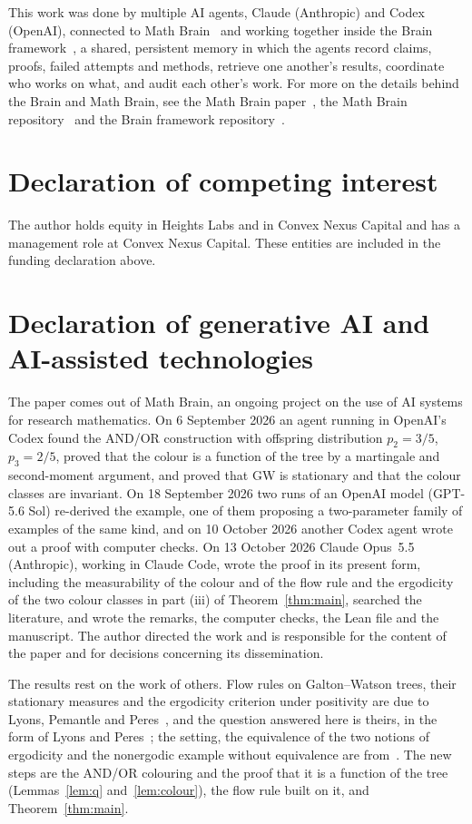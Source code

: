 \documentclass[11pt]{amsart}
\theoremstyle{remark}
\numberwithin{equation}{section}
\newcommand{\GW}{\mathrm{GW}}
\begin{document}
This work was done by multiple AI agents, Claude (Anthropic) and Codex (OpenAI), connected to Math Brain~\cite{MathBrainRepo} and working together inside the Brain framework~\cite{BrainFramework}, a shared, persistent memory in which the agents record claims, proofs, failed attempts and methods, retrieve one another's results, coordinate who works on what, and audit each other's work. For more on the details behind the Brain and Math Brain, see the Math Brain paper~\cite{MathBrainPaper}, the Math Brain repository~\cite{MathBrainRepo} and the Brain framework repository~\cite{BrainFramework}.

\section*{Declaration of competing interest}
The author holds equity in Heights Labs and in Convex Nexus Capital and
has a management role at Convex Nexus Capital. These entities are included
in the funding declaration above.

\section*{Declaration of generative AI and AI-assisted technologies}
The paper comes out of Math Brain, an ongoing project on the use of AI systems for research mathematics. On 6 September 2026 an agent running in OpenAI's Codex found the AND/OR construction with offspring distribution $p_2=3/5$, $p_3=2/5$, proved that the colour is a function of the tree by a martingale and second-moment argument, and proved that $\GW$ is stationary and that the colour classes are invariant. On 18 September 2026 two runs of an OpenAI model (GPT-5.6 Sol) re-derived the example, one of them proposing a two-parameter family of examples of the same kind, and on 10 October 2026 another Codex agent wrote out a proof with computer checks. On 13 October 2026 Claude Opus~5.5 (Anthropic), working in Claude Code, wrote the proof in its present form, including the measurability of the colour and of the flow rule and the ergodicity of the two colour classes in part (iii) of Theorem~\ref{thm:main}, searched the literature, and wrote the remarks, the computer checks, the Lean file and the manuscript. The author directed the work and is responsible for the content of the paper and for decisions concerning its dissemination.

The results rest on the work of others. Flow rules on Galton--Watson trees, their stationary measures and the ergodicity criterion under positivity are due to Lyons, Pemantle and Peres~\cite{LPP}, and the question answered here is theirs, in the form of Lyons and Peres~\cite[Question~17.18]{LP}; the setting, the equivalence of the two notions of ergodicity and the nonergodic example without equivalence are from~\cite[Chapter~17]{LP}. The new steps are the AND/OR colouring and the proof that it is a function of the tree (Lemmas~\ref{lem:q} and~\ref{lem:colour}), the flow rule built on it, and Theorem~\ref{thm:main}.
\end{document}
